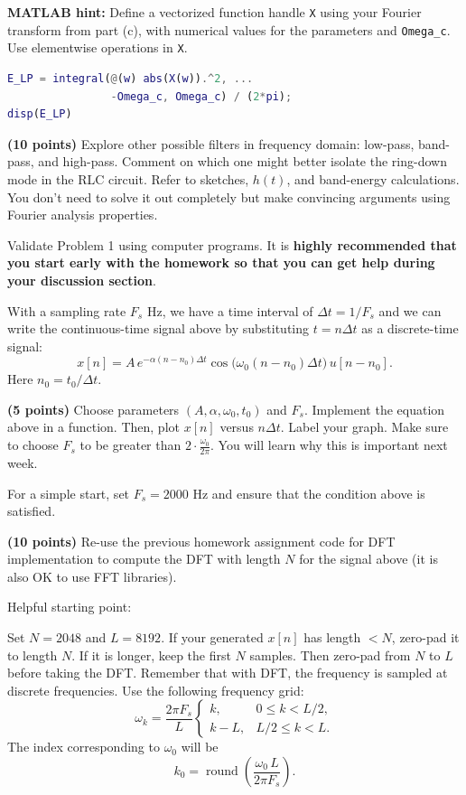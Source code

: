 \documentclass{ee102_pset}
\begin{document}
\noindent\begin{minipage}{\linewidth}
\textbf{MATLAB hint:} Define a vectorized function handle \texttt{X} using your Fourier transform from part (c), with numerical values for the parameters and \texttt{Omega\_c}. Use elementwise operations in \texttt{X}.
\begin{lstlisting}[language=Matlab,basicstyle=\ttfamily\small,frame=single,breaklines=true,columns=fullflexible]
E_LP = integral(@(w) abs(X(w)).^2, ...
                -Omega_c, Omega_c) / (2*pi);
disp(E_LP)
\end{lstlisting}
\end{minipage}

\problempart \textbf{(10 points)}
Explore other possible filters in frequency domain: low-pass, band-pass, and high-pass. Comment on which one might better isolate the ring-down mode in the RLC circuit. Refer to sketches, \(h(t)\), and band-energy calculations. You don't need to solve it out completely but make convincing arguments using Fourier analysis properties.


 Validate Problem 1 using computer programs. It is \textbf{highly recommended that you start early with the homework so that you can get help during your discussion section}.

With a sampling rate \(F_s\) Hz, we have a time interval of \(\Delta t=1/F_s\) and we can write the continuous-time signal above by substituting \(t=n\Delta t\) as a discrete-time signal:
\[
x[n]=A\,e^{-\alpha(n-n_0)\Delta t}\cos\!\big(\omega_0 (n-n_0)\Delta t\big)\,u[n-n_0].
\]
Here \(n_0=t_0/\Delta t\).

\problempart \textbf{(5 points)}
Choose parameters \((A,\alpha,\omega_0,t_0)\) and \(F_s\). Implement the equation above in a function. Then, plot \(x[n]\) versus \(n\Delta t\). Label your graph.
Make sure to choose $F_s$ to be greater than \(2 \cdot \frac{\omega_0}{2\pi}\). You will learn why this is important next week. 

For a simple start, set $F_s = 2000$ Hz and ensure that the condition above is satisfied.

\problempart \textbf{(10 points)}
Re-use the previous homework assignment code for DFT implementation to compute the DFT with length \(N\) for the signal above (it is also OK to use FFT libraries). 

Helpful starting point:

Set $N = 2048$ and $L = 8192$. If your generated \(x[n]\) has length \(<N\), zero-pad it to length \(N\). If it is longer, keep the first \(N\) samples. Then zero-pad from \(N\) to \(L\) before taking the DFT. Remember that with DFT, the frequency is sampled at discrete frequencies. Use the following frequency grid:
\[
\omega_k=\frac{2\pi F_s}{L}
\begin{cases}
k,&0\le k<L/2,\\
k-L,&L/2\le k<L.
\end{cases}
\]
The index corresponding to \(\omega_0\) will be 
\[
k_0=\operatorname{round}\!\left(\frac{\omega_0\,L}{2\pi F_s}\right).
\]
\end{document}
